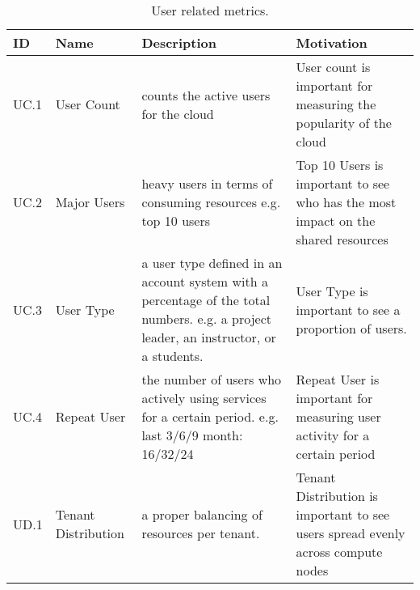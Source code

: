 \begin{table*}[P]
\caption{User related metrics.}
\label{T:metrics-bigtable}
\bigskip
\begin{scriptsize}
\begin{center}
\begin{tabular}{lp{}p{}p{}}
\hline
\rowcolor{blue!20} \bf ID & \bf Name & \bf Description & \bf Motivation \\
\hline
UC.1&
User Count & 
 counts the active users for the cloud &
User count is important for measuring the popularity of the cloud \\
\hline
UC.2&
Major Users &
heavy users in terms of consuming resources e.g. top 10 users &
Top 10 Users is important to see who has the most impact on the shared resources \\
\hline
UC.3 &
User Type &
a user type defined in an account system with a percentage of
the total numbers. e.g. a project leader, an instructor, or a students. & 
User Type is important to see a proportion of users.  \\
\hline
UC.4 &
Repeat User&
the number of users who actively using services for a certain period.  e.g. last 3/6/9 month: 16/32/24 &
Repeat User is important for measuring user activity for a certain period \\
\hline
UD.1 &
Tenant Distribution&
a proper balancing of resources per tenant. &
Tenant Distribution is important to see users spread evenly across compute nodes \\
\hline
\end{tabular}
\end{center}
\end{scriptsize}
\end{table*}


